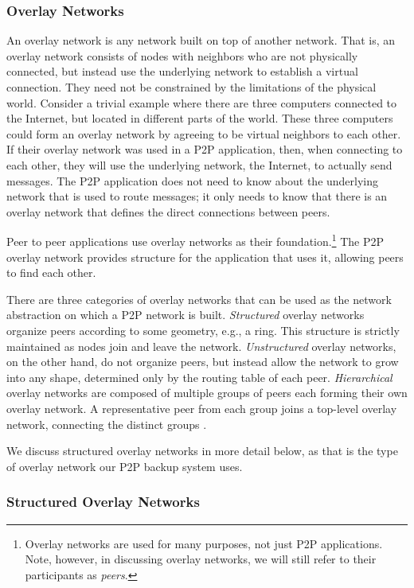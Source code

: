 \documentclass[12pt]{report}
\begin{document}
\subsubsection{Overlay Networks}

An overlay network is any network built on top of another network. That is, an overlay network consists of nodes with neighbors who are not physically connected, but instead use the underlying network to establish a virtual connection. They need not be constrained by the limitations of the physical world. Consider a trivial example where there are three computers connected to the Internet, but located in different parts of the world. These three computers could form an overlay network by agreeing to be virtual neighbors to each other. If their overlay network was used in a P2P application, then, when connecting to each other, they will use the underlying network, the Internet, to actually send messages. The P2P application does not need to know about the underlying network that is used to route messages; it only needs to know that there is an overlay network that defines the direct connections between peers.

Peer to peer applications use overlay networks as their foundation.\footnote{Overlay networks are used for many purposes, not just P2P applications. Note, however, in discussing overlay networks, we will still refer to their participants as \textit{peers}.}  The P2P overlay network provides structure for the application that uses it, allowing peers to find each other.

There are three categories of overlay networks that can be used as the network abstraction on which a P2P network is built. \textit{Structured} overlay networks organize peers according to some geometry, e.g., a ring. This structure is strictly maintained as nodes join and leave the network. \textit{Unstructured} overlay networks, on the other hand, do not organize peers, but instead allow the network to grow into any shape, determined only by the routing table of each peer. \textit{Hierarchical} overlay networks are composed of multiple groups of peers each forming their own overlay network. A representative peer from each group joins a top-level overlay network, connecting the distinct groups \cite{p2pSurvey}. 

We discuss structured overlay networks in more detail below, as that is the type of overlay network our P2P backup system uses.

\subsubsection{Structured Overlay Networks} \label{subsubsec:StructuredOverlayNetworks}
\end{document}
